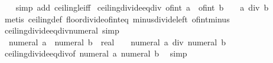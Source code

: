 \begin{isabellebody}
%
\isadelimproof
\ \ %
\endisadelimproof
%
\isatagproof
{}\isamarkupfalse%
\ {\isacharparenleft}{\kern0pt}simp\ add{\isacharcolon}{\kern0pt}\ ceiling{\isacharunderscore}{\kern0pt}le{\isacharunderscore}{\kern0pt}iff{\isacharparenright}{\kern0pt}%
\endisatagproof
{\isafoldproof}%
%
\isadelimproof
\isanewline
%
\endisadelimproof
\isanewline
{}\isamarkupfalse%
\ ceiling{\isacharunderscore}{\kern0pt}divide{\isacharunderscore}{\kern0pt}eq{\isacharunderscore}{\kern0pt}div{\isacharcolon}{\kern0pt}\ {\isachardoublequoteopen}{\isasymlceil}of{\isacharunderscore}{\kern0pt}int\ a\ {\isacharslash}{\kern0pt}\ of{\isacharunderscore}{\kern0pt}int\ b{\isasymrceil}\ {\isacharequal}{\kern0pt}\ {\isacharminus}{\kern0pt}\ {\isacharparenleft}{\kern0pt}{\isacharminus}{\kern0pt}\ a\ div\ b{\isacharparenright}{\kern0pt}{\isachardoublequoteclose}\isanewline
%
\isadelimproof
\ \ %
\endisadelimproof
%
\isatagproof
{}\isamarkupfalse%
\ {\isacharparenleft}{\kern0pt}metis\ ceiling{\isacharunderscore}{\kern0pt}def\ floor{\isacharunderscore}{\kern0pt}divide{\isacharunderscore}{\kern0pt}of{\isacharunderscore}{\kern0pt}int{\isacharunderscore}{\kern0pt}eq\ minus{\isacharunderscore}{\kern0pt}divide{\isacharunderscore}{\kern0pt}left\ of{\isacharunderscore}{\kern0pt}int{\isacharunderscore}{\kern0pt}minus{\isacharparenright}{\kern0pt}%
\endisatagproof
{\isafoldproof}%
%
\isadelimproof
\isanewline
%
\endisadelimproof
\isanewline
{}\isamarkupfalse%
\ ceiling{\isacharunderscore}{\kern0pt}divide{\isacharunderscore}{\kern0pt}eq{\isacharunderscore}{\kern0pt}div{\isacharunderscore}{\kern0pt}numeral\ {\isacharbrackleft}{\kern0pt}simp{\isacharbrackright}{\kern0pt}{\isacharcolon}{\kern0pt}\isanewline
\ \ {\isachardoublequoteopen}{\isasymlceil}numeral\ a\ {\isacharslash}{\kern0pt}\ numeral\ b\ {\isacharcolon}{\kern0pt}{\isacharcolon}{\kern0pt}\ real{\isasymrceil}\ {\isacharequal}{\kern0pt}\ {\isacharminus}{\kern0pt}\ {\isacharparenleft}{\kern0pt}{\isacharminus}{\kern0pt}\ numeral\ a\ div\ numeral\ b{\isacharparenright}{\kern0pt}{\isachardoublequoteclose}\isanewline
%
\isadelimproof
\ \ %
\endisadelimproof
%
\isatagproof
{}\isamarkupfalse%
\ ceiling{\isacharunderscore}{\kern0pt}divide{\isacharunderscore}{\kern0pt}eq{\isacharunderscore}{\kern0pt}div{\isacharbrackleft}{\kern0pt}of\ {\isachardoublequoteopen}numeral\ a{\isachardoublequoteclose}\ {\isachardoublequoteopen}numeral\ b{\isachardoublequoteclose}{\isacharbrackright}{\kern0pt}\ \isamarkupfalse%
\ simp%
\endisatagproof
{\isafoldproof}%
%
\isadelimproof
\isanewline

\end{isabellebody}
